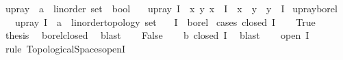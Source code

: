 \begin{isabellebody}
\isanewline
{}\isamarkupfalse%
\ up{\isacharunderscore}{\kern0pt}ray\ {\isacharcolon}{\kern0pt}{\isacharcolon}{\kern0pt}\ {\isachardoublequoteopen}{\isacharparenleft}{\kern0pt}{\isacharprime}{\kern0pt}a\ {\isacharcolon}{\kern0pt}{\isacharcolon}{\kern0pt}\ linorder{\isacharparenright}{\kern0pt}\ set\ {\isasymRightarrow}\ bool{\isachardoublequoteclose}\ \isanewline
\ \ {\isachardoublequoteopen}up{\isacharunderscore}{\kern0pt}ray\ I\ {\isacharequal}{\kern0pt}\ {\isacharparenleft}{\kern0pt}{\isasymforall}x\ y{\isachardot}{\kern0pt}\ x\ {\isasymin}\ I\ {\isasymlongrightarrow}\ x\ {\isasymle}\ y\ {\isasymlongrightarrow}\ y\ {\isasymin}\ I{\isacharparenright}{\kern0pt}{\isachardoublequoteclose}\isanewline
\isanewline
{}\isamarkupfalse%
\ up{\isacharunderscore}{\kern0pt}ray{\isacharunderscore}{\kern0pt}borel{\isacharcolon}{\kern0pt}\isanewline
\ \ \ {\isachardoublequoteopen}up{\isacharunderscore}{\kern0pt}ray\ {\isacharparenleft}{\kern0pt}I\ {\isacharcolon}{\kern0pt}{\isacharcolon}{\kern0pt}\ {\isacharparenleft}{\kern0pt}{\isacharparenleft}{\kern0pt}{\isacharprime}{\kern0pt}a\ {\isacharcolon}{\kern0pt}{\isacharcolon}{\kern0pt}\ linorder{\isacharunderscore}{\kern0pt}topology{\isacharparenright}{\kern0pt}\ set{\isacharparenright}{\kern0pt}{\isacharparenright}{\kern0pt}{\isachardoublequoteclose}\isanewline
\ \ \ {\isachardoublequoteopen}I\ {\isasymin}\ borel{\isachardoublequoteclose}\isanewline
%
\isadelimproof
%
\endisadelimproof
%
\isatagproof
{}\isamarkupfalse%
\ {\isacharparenleft}{\kern0pt}cases\ {\isachardoublequoteopen}closed\ I{\isachardoublequoteclose}{\isacharparenright}{\kern0pt}\isanewline
\ \ \isamarkupfalse%
\ True\isanewline
\ \ \isamarkupfalse%
\ \isamarkupfalse%
\ {\isacharquery}{\kern0pt}thesis\ \isamarkupfalse%
\ borel{\isacharunderscore}{\kern0pt}closed\ \isamarkupfalse%
\ blast\isanewline
{}\isamarkupfalse%
\isanewline
\ \ \isamarkupfalse%
\ False\isanewline
\ \ \isamarkupfalse%
\ b{\isacharcolon}{\kern0pt}{\isachardoublequoteopen}{\isasymnot}\ closed\ I{\isachardoublequoteclose}\ \isamarkupfalse%
\ blast\isanewline
\isanewline
\ \ \isamarkupfalse%
\ {\isachardoublequoteopen}open\ I{\isachardoublequoteclose}\isanewline
\ \ \isamarkupfalse%
\ {\isacharparenleft}{\kern0pt}rule\ Topological{\isacharunderscore}{\kern0pt}Spaces{\isachardot}{\kern0pt}openI{\isacharparenright}{\kern0pt}\isanewline

\end{isabellebody}
